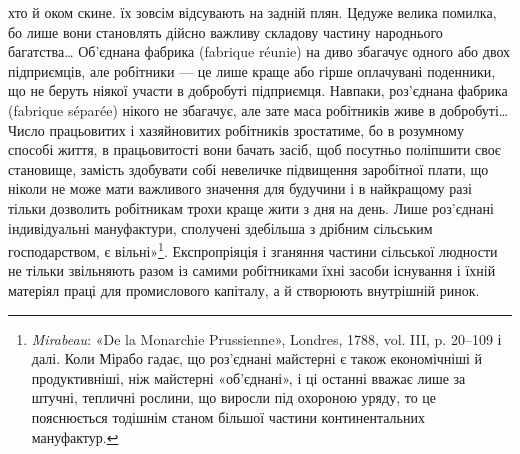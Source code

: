 хто й оком скине. їх зовсім відсувають на задній плян. Цедуже
велика помилка, бо лише вони становлять дійсно важливу складову
частину народнього багатства\dots{} Об’єднана фабрика (fabrique
réunie) на диво збагачує одного або двох підприємців, але
робітники — це лише краще або гірше оплачувані поденники,
що не беруть ніякої участи в добробуті підприємця. Навпаки,
роз’єднана фабрика (fabrique séparée) нікого не збагачує, але
зате маса робітників живе в добробуті\dots{} Число працьовитих і
хазяйновитих робітників зростатиме, бо в розумному способі
життя, в працьовитості вони бачать засіб, щоб посутньо поліпшити
своє становище, замість здобувати собі невеличке підвищення
заробітної плати, що ніколи не може мати важливого
значення для будучини і в найкращому разі тільки дозволить
робітникам трохи краще жити з дня на день. Лише роз’єднані
індивідуальні мануфактури, сполучені здебільша з дрібним сільським
господарством, є вільні»\footnote{
\emph{Mirabeau}: «De la Monarchie Prussienne», Londres, 1788, vol. III,
p. 20--109 і далі. Коли Мірабо гадає, що роз’єднані майстерні є
також економічніші й продуктивніші, ніж майстерні «об’єднані», і ці
останні вважає лише за штучні, тепличні рослини, що виросли під охороною
уряду, то це пояснюється тодішнім станом більшої частини континентальних
мануфактур.
}. Експропріяція і зганяння
частини сільської людности не тільки звільняють разом із самими
робітниками їхні засоби існування і їхній матеріял праці для
промислового капіталу, а й створюють внутрішній ринок.

